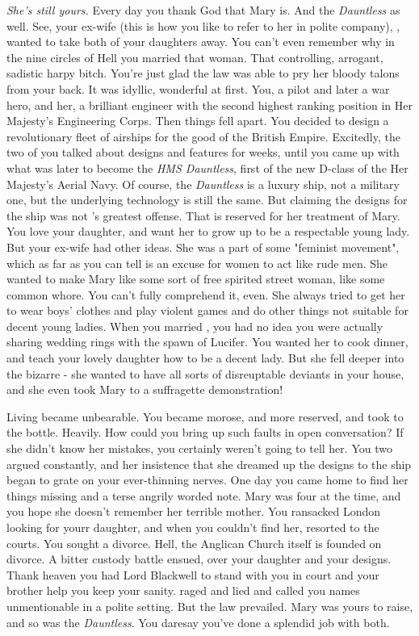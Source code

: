 \documentclass[char]{airship}
\begin{document}
{\it She's still yours.} Every day you thank God that Mary is. And the
{\it Dauntless} as well. See, your ex-wife (this is how you like to
refer to her in polite company), \cCurie{\intro}, wanted to take both
of your daughters away. You can't even remember why in the nine
circles of Hell you married that woman. That controlling, arrogant,
sadistic harpy bitch. You're just glad the law was able to pry her
bloody talons from your back. It was idyllic, wonderful at first. You,
a pilot and later a war hero, and her, a brilliant engineer with the
second highest ranking position in Her Majesty's Engineering
Corps. Then things fell apart. You decided to design a revolutionary
fleet of airships for the good of the British Empire. Excitedly, the
two of you talked about designs and features for weeks, until you came
up with what was later to become the {\it HMS Dauntless}, first of the
new D-class of the Her Majesty's Aerial Navy. Of course, the {\it
Dauntless} is a luxury ship, not a military one, but the underlying
technology is still the same. But claiming the designs for the ship
was not \cCurie{}'s greatest offense. That is reserved for her
treatment of Mary. You love your daughter, and want her to grow up to
be a respectable young lady. But your ex-wife had other ideas. She was
a part of some "feminist movement", which as far as you can tell is an
excuse for women to act like rude men. She wanted to make Mary like
some sort of free spirited street woman, like some common whore. You
can't fully comprehend it, even. She always tried to get her to wear
boys' clothes and play violent games and do other things not suitable
for decent young ladies. When you married \cCurie{}, you had no idea
you were actually sharing wedding rings with the spawn of Lucifer. You
wanted her to cook dinner, and teach your lovely daughter how to be a
decent lady. But she fell deeper into the bizarre - she wanted to have
all sorts of disreuptable deviants in your house, and she even took
Mary to a suffragette demonstration!

Living became unbearable. You became morose, and more reserved, and
took to the bottle. Heavily. How could you bring up such faults in
open conversation? If she didn't know her mistakes, you certainly
weren't going to tell her. You two argued constantly, and her
insistence that she dreamed up the designs to the ship began to grate
on your ever-thinning nerves. One day you came home to find her things
missing and a terse angrily worded note. Mary was four at the time,
and you hope she doesn't remember her terrible mother. You ransacked
London looking for yourr daughter, and when you couldn't find her,
resorted to the courts. You sought a divorce. Hell, the Anglican
Church itself is founded on divorce. A bitter custody battle ensued,
over your daughter and your designs. Thank heaven you had Lord
Blackwell to stand with you in court and your brother help you keep
your sanity. \cCurie{} raged and lied and called you names
unmentionable in a polite setting. But the law prevailed. Mary was
yours to raise, and so was the {\it Dauntless}. You daresay you've
done a splendid job with both. 
\end{document}
